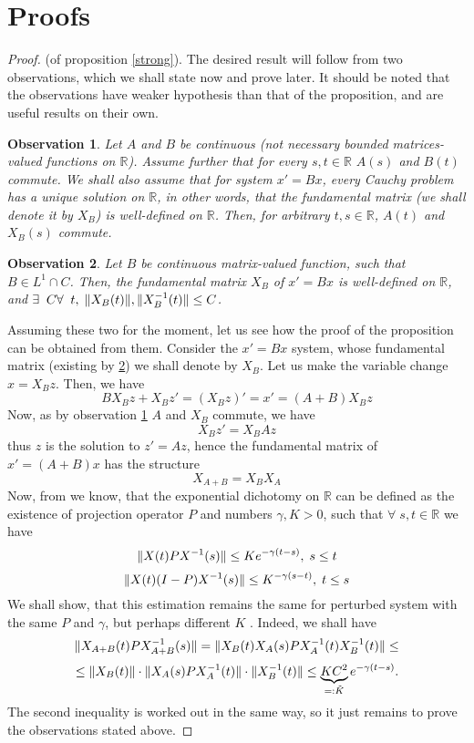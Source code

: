 \documentclass[12pt]{article} %
\let\oldforall\forall
\renewcommand{\forall}{\oldforall\;}
\let\oldexists\exists
\renewcommand{\exists}{\oldexists\;}
\newtheorem{observation}{Observation}
\theoremstyle{remark}
\begin{document}
\section{Proofs}
\begin{proof}{(of proposition \ref{strong}).\;}
The desired result will follow from two observations, which we shall state now and prove later. It should be noted that the observations have
weaker hypothesis than that of the proposition, and are useful results on their own.
\begin{observation}\label{Hard}Let $A$ and $B$ be continuous (not necessary bounded matrices-valued functions on $\mathbb{R}$). Assume further
that for every $s,t\in\mathbb{R}$ $A(s)$ and $B(t)$ commute. We shall also assume that for system $x'=Bx$, every Cauchy problem has a unique
solution on $\mathbb{R}$, in other words, that the fundamental matrix (we shall denote it by $X_B$) is well-defined on $\mathbb{R}$. Then,
for arbitrary $t,s\in\mathbb{R}$, $A(t)$ and $X_B(s)$ commute.
\end{observation}
\begin{observation}\label{Easy}Let $B$ be continuous matrix-valued function, such that $B\in L^1\cap C$. Then,
the fundamental matrix $X_B$ of $x'=Bx$ is well-defined on $\mathbb{R}$, and $\exists C\forall t,\;\mynorm{X_B(t)},\mynorm{X^{-1}_B
(t)}\leq C$.
\end{observation}
Assuming these two for the moment, let us see how the proof of the proposition can be obtained from them. Consider the $x'=Bx$ system, whose
fundamental matrix (existing by \ref{Easy}) we shall denote by $X_B$. Let us make the variable change $x=X_Bz$. Then, we have
\[BX_Bz+X_Bz'=(X_Bz)'=x'=(A+B)X_Bz\]
Now, as by observation \ref{Hard} $A$ and $X_B$ commute, we have
\[X_Bz'=X_BAz\]
thus $z$ is the solution to $z'=Az$, hence the fundamental matrix of $x'=(A+B)x$ has the structure
\[X_{A+B}=X_BX_A\]
Now, from \cite{coppel} we know, that the exponential dichotomy on $\mathbb{R}$ can be defined as the existence of projection operator $P$
and numbers $\gamma,K>0$, such that $\forall s,t\in\mathbb{R}$ we have
\[\|X(t)PX^{-1}(s)\|\leq Ke^{-\gamma(t-s)},\;s\leq t\]
\[\|X(t)(I-P)X^{-1}(s)\|\leq K^{-\gamma(s-t)},\;t\leq s\]
We shall show, that this estimation remains the same for perturbed system  with the same $P$ and $\gamma$, but perhaps different $K$
. Indeed, we shall have
\[\|X_{A+B}(t)PX^{-1}_{A+B}(s)\|=\|X_B(t)X_A(s)PX^{-1}_A(t)X^{-1}_B(t)\|\leq\]
\[\leq\|X_B(t)\|\cdot\|X_A(s)PX^{-1}_A(t)\|\cdot\|X^{-1}_B(t)\|\leq \underbrace{KC^2}_{=:\tilde{K}}e^{-\gamma(t-s)}.\]
The second inequality is worked out in the same way, so it just remains to prove the observations stated above.
\end{proof}
\end{document}
